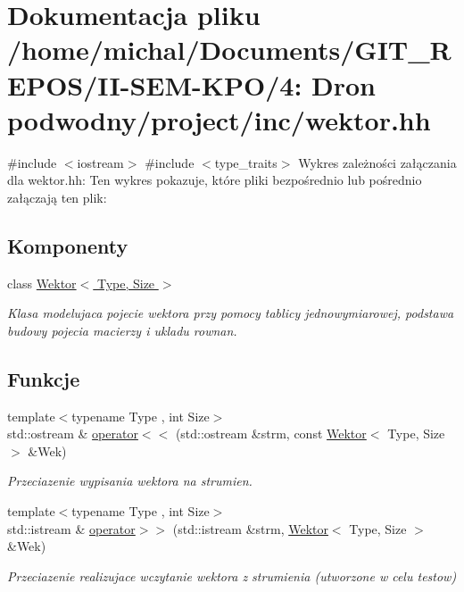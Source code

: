 \hypertarget{wektor_8hh}{}\section{Dokumentacja pliku /home/michal/\+Documents/\+G\+I\+T\+\_\+\+R\+E\+P\+O\+S/\+I\+I-\/\+S\+E\+M-\/\+K\+P\+O/4\+: Dron podwodny/project/inc/wektor.hh}
\label{wektor_8hh}
{\ttfamily \#include $<$iostream$>$}\newline
{\ttfamily \#include $<$type\+\_\+traits$>$}\newline
Wykres zależności załączania dla wektor.\+hh\+:
Ten wykres pokazuje, które pliki bezpośrednio lub pośrednio załączają ten plik\+:
\subsection*{Komponenty}
\begin{DoxyCompactItemize}
\item 
class \hyperlink{class_wektor}{Wektor$<$ Type, Size $>$}
\begin{DoxyCompactList}\small\item\em Klasa modelujaca pojecie wektora przy pomocy tablicy jednowymiarowej, podstawa budowy pojecia macierzy i ukladu rownan. \end{DoxyCompactList}\end{DoxyCompactItemize}
\subsection*{Funkcje}
\begin{DoxyCompactItemize}
\item 
{\footnotesize template$<$typename Type , int Size$>$ }\\std\+::ostream \& \hyperlink{wektor_8hh_aed5b68ac0443076ac8f2479d24ce5b67}{operator$<$$<$} (std\+::ostream \&strm, const \hyperlink{class_wektor}{Wektor}$<$ Type, Size $>$ \&Wek)
\begin{DoxyCompactList}\small\item\em Przeciazenie wypisania wektora na strumien. \end{DoxyCompactList}\item 
{\footnotesize template$<$typename Type , int Size$>$ }\\std\+::istream \& \hyperlink{wektor_8hh_ac21abfcf8fff6d5e7e32b0d891533f2c}{operator$>$$>$} (std\+::istream \&strm, \hyperlink{class_wektor}{Wektor}$<$ Type, Size $>$ \&Wek)
\begin{DoxyCompactList}\small\item\em Przeciazenie realizujace wczytanie wektora z strumienia (utworzone w celu testow) \end{DoxyCompactList}\end{DoxyCompactItemize}


